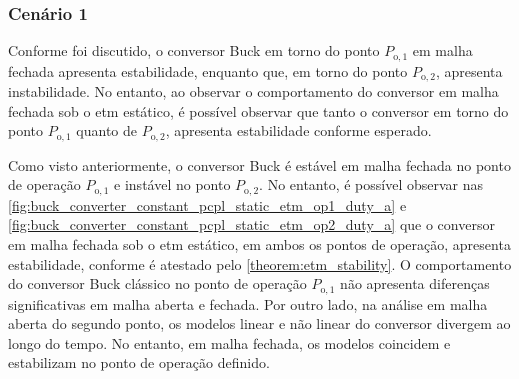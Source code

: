 \subsubsection{Cenário 1}

Conforme foi discutido, o conversor Buck em torno do ponto $P_{\mathrm{o}, 1}$ em malha fechada apresenta estabilidade, enquanto que, em torno do ponto $P_{\mathrm{o}, 2}$, apresenta instabilidade. No entanto, ao observar o comportamento do conversor em malha fechada sob o \acrshort{etm} estático, é possível observar que tanto o conversor em torno do ponto $P_{\mathrm{o}, 1}$ quanto de $P_{\mathrm{o}, 2}$, apresenta estabilidade conforme esperado.

Como visto anteriormente, o conversor Buck é estável em malha fechada no ponto de operação  $P_{\mathrm{o}, 1}$ e instável no ponto  $P_{\mathrm{o}, 2}$. No entanto, é possível observar nas \autoref{fig:buck_converter_constant_pcpl_static_etm_op1_duty_a} e \autoref{fig:buck_converter_constant_pcpl_static_etm_op2_duty_a} que o conversor em malha fechada sob o \acrshort{etm} estático, em ambos os pontos de operação,  apresenta estabilidade, conforme é atestado pelo \autoref{theorem:etm_stability}. O comportamento do conversor Buck clássico no ponto de operação $P_{\mathrm{o}, 1}$ não apresenta diferenças significativas em malha aberta e fechada. Por outro lado, na análise em malha aberta do segundo ponto, os modelos linear e não linear do conversor divergem ao longo do tempo. No entanto, em malha fechada, os modelos coincidem e estabilizam no ponto de operação definido.


